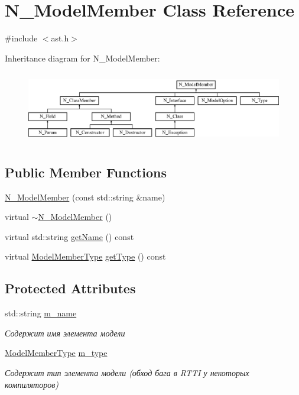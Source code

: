 \hypertarget{classN__ModelMember}{}\section{N\+\_\+\+Model\+Member Class Reference}
\label{classN__ModelMember}


{\ttfamily \#include $<$ast.\+h$>$}

Inheritance diagram for N\+\_\+\+Model\+Member\+:\begin{figure}[H]
\begin{center}
\leavevmode
\includegraphics[height=3.190883cm]{classN__ModelMember}
\end{center}
\end{figure}
\subsection*{Public Member Functions}
\begin{DoxyCompactItemize}
\item 
\hyperlink{classN__ModelMember_ad34bba976ee6ee27b40ac4a60f6dc5e3}{N\+\_\+\+Model\+Member} (const std\+::string \&name)
\item 
virtual \hyperlink{classN__ModelMember_a4e46924533169c31720e83d1ddb8e7a1}{$\sim$\+N\+\_\+\+Model\+Member} ()
\item 
virtual std\+::string \hyperlink{classN__ModelMember_a942c73d190ee3d70fd65a57cd0ccea58}{get\+Name} () const 
\item 
virtual \hyperlink{ast_8h_a8a68ec34a59539de78ad64e57901b788}{Model\+Member\+Type} \hyperlink{classN__ModelMember_ade7ce7917050133c412d62a42453d709}{get\+Type} () const 
\end{DoxyCompactItemize}
\subsection*{Protected Attributes}
\begin{DoxyCompactItemize}
\item 
std\+::string \hyperlink{classN__ModelMember_a23a1f400b93fe4610ae59d1984195883}{m\+\_\+name}
\begin{DoxyCompactList}\small\item\em Содержит имя элемента модели \end{DoxyCompactList}\item 
\hyperlink{ast_8h_a8a68ec34a59539de78ad64e57901b788}{Model\+Member\+Type} \hyperlink{classN__ModelMember_a14c638e44cc0b3143dcb3bbf0f65dc6a}{m\+\_\+type}
\begin{DoxyCompactList}\small\item\em Содержит тип элемента модели (обход бага в R\+T\+T\+I у некоторых компиляторов) \end{DoxyCompactList}\end{DoxyCompactItemize}


